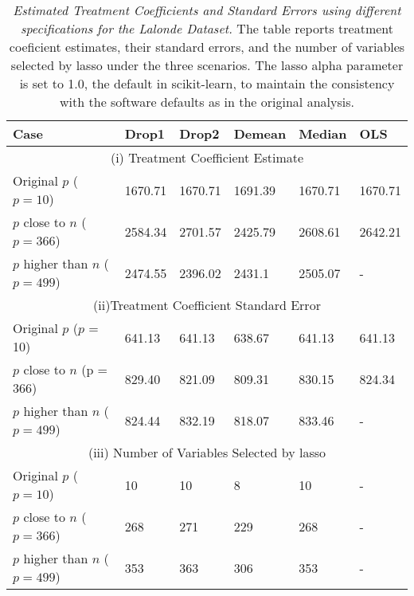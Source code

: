 \begin{table}[h!]
\renewcommand{\arraystretch}{1.5}
\centering
\begin{tabular}{||l l l l l l||} 
 \hline
 \hline
 Case & Drop1 & Drop2 & Demean & Median & OLS \\ [0.5ex] 
 \hline \hline
 \multicolumn{6}{||c||}{(i) Treatment Coefficient Estimate} \\ [0.5ex]
 Original $p$ ($p = 10$) & 1670.71 & 1670.71 & 1691.39 & 1670.71 & 1670.71 \\ 
 $p$ close to $n$ ($p = 366$) & 2584.34 & 2701.57 & 2425.79 & 2608.61 & 2642.21 \\
 $p$ higher than $n$ ($p= 499$) & 2474.55 & 2396.02 & 2431.1 & 2505.07 & - \\ [1ex] 
 \hline
 \multicolumn{6}{||c||}{(ii)Treatment Coefficient Standard Error} \\ [0.5ex]
 Original $p$ ($p$ = 10) & 641.13 & 641.13 & 638.67 & 641.13 & 641.13 \\ 
 $p$ close to $n$ (p = 366) & 829.40 & 821.09 & 809.31 & 830.15 & 824.34 \\
 $p$ higher than $n$ ($p= 499$)  & 824.44 & 832.19 & 818.07 & 833.46 & - \\ [1ex] 
 \hline
 \multicolumn{6}{||c||}{(iii) Number of Variables Selected by lasso} \\ [0.5ex]
 Original $p$ ($p = 10$) & 10 & 10 & 8 & 10 & - \\ 
 $p$ close to $n$ ($p = 366$) & 268 & 271 & 229 & 268 & - \\
 $p$ higher than $n$ ($p= 499$) & 353 & 363 & 306 & 353 & - \\ [1ex] 
 \hline \hline
\end{tabular}
\caption{\textit{Estimated Treatment Coefficients and Standard Errors using different specifications for the Lalonde Dataset.} The table reports treatment coeficient estimates, their standard errors, and the number of variables selected by lasso under the three scenarios. The lasso alpha parameter is set to 1.0, the default in scikit-learn, to maintain the consistency with the software defaults as in the original analysis. }
\label{table:1}
\end{table}

